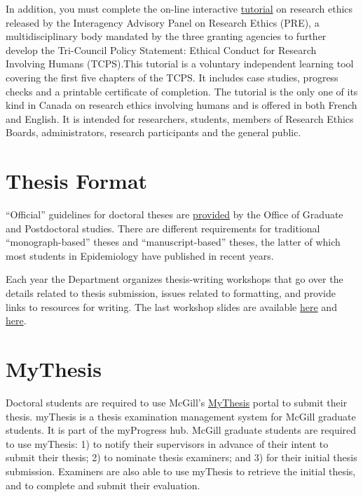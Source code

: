 \documentclass[
  letterpaper,
  DIV=11,
  numbers=noendperiod]{scrreprt}
\begin{document}
In addition, you must complete the on-line interactive
\href{https://tcps2core.ca/welcome}{tutorial} on research ethics
released by the Interagency Advisory Panel on Research Ethics (PRE), a
multidisciplinary body mandated by the three granting agencies to
further develop the Tri-Council Policy Statement: Ethical Conduct for
Research Involving Humans (TCPS).This tutorial is a voluntary
independent learning tool covering the first five chapters of the TCPS.
It includes case studies, progress checks and a printable certificate of
completion. The tutorial is the only one of its kind in Canada on
research ethics involving humans and is offered in both French and
English. It is intended for researchers, students, members of Research
Ethics Boards, administrators, research participants and the general
public.

\section{Thesis Format}\label{thesis-format}

``Official'' guidelines for doctoral theses are
\href{https://www.mcgill.ca/gps/thesis/thesis-guidelines/preparation}{provided}
by the Office of Graduate and Postdoctoral studies. There are different
requirements for traditional ``monograph-based'' theses and
``manuscript-based'' theses, the latter of which most students in
Epidemiology have published in recent years.

Each year the Department organizes thesis-writing workshops that go over
the details related to thesis submission, issues related to formatting,
and provide links to resources for writing. The last workshop slides are
available
\href{data/PhD_Epi_Thesis_Writing_Workshop_9May2023_KHayden.pdf}{here}
and \href{data/thesis-workshop-PhD-2023-05-09.pdf}{here}.

\section{MyThesis}\label{mythesis}

Doctoral students are required to use McGill's
\href{https://www.mcgill.ca/gps/thesis/thesis-guidelines/initial-submission/what-mythesis}{MyThesis}
portal to submit their thesis. myThesis is a thesis examination
management system for McGill graduate students. It is part of the
myProgress hub. McGill graduate students are required to use myThesis:
1) to notify their supervisors in advance of their intent to submit
their thesis; 2) to nominate thesis examiners; and 3) for their initial
thesis submission. Examiners are also able to use myThesis to retrieve
the initial thesis, and to complete and submit their evaluation.
\end{document}
